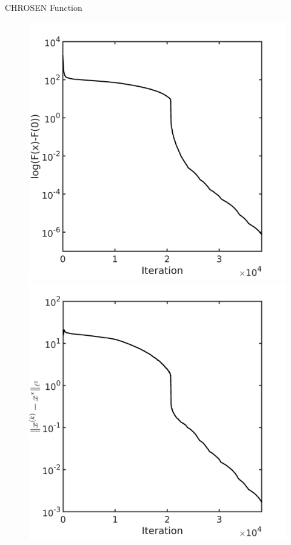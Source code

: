 \documentclass{beamer}
\begin{document}
\begin{frame}{CHROSEN Function}
\begin{figure}[!htbp]
	  \includegraphics[scale=0.21]{./figures/chrosen100D.png}
	  \includegraphics[scale=0.21]{./figures/chrosen100D_dist.png}
\end{figure}
\end{frame}
\end{document}
